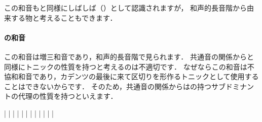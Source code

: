 \documentclass[dvipdfmx,uplatex,b5paper,openany,jbase=12Q,nomag*,textwidth-limit=44%
               ]{gachimuchi}[2020/05/05]
\begin{document}
この和音も\Gnii\Dimt と同様にしばしば（）として認識されますが，
和声的長音階から由来する物と考えることもできます．

\paragraph{\bFlat\Gnvi\Aug の和音}
この和音は増三和音であり，和声的長音階で見られます．
共通音の関係から\Gni と同様にトニックの性質を持つと考えるのは不適切です．
なぜならこの和音は不協和和音であり，カデンツの最後に来て区切りを形作るトニックとして使用することはできないからです．
そのため，共通音の関係からは\Gniv\Min の持つサブドミナントの代理の性質を持つといえます．

\begin{floatMusic}[pos=ht]
  \Startpiece%
  \znotes|\en
  \znotes|\en
  \NOTes
  |%
  \en\bar
  \NOTes
  |%
  \en\doublebar
  \NOTes
  \Mryaku\sk|\Mryaku\sk
  \en\bar
  \NOTes
  |%
  \en\doublebar
  \znotes|\en
  \NOTEs
  |%
  \en\bar
  \NOTEs
  |%
  \en\setdoublebar
  \endpiece%
\end{floatMusic}
\end{document}
